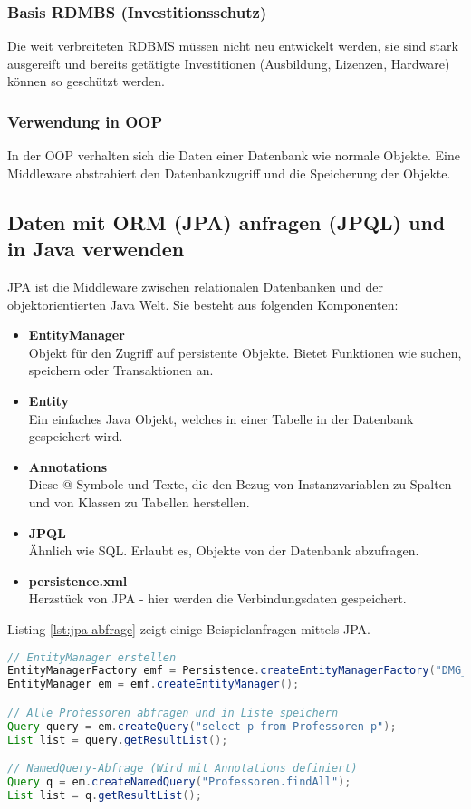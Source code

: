 \subsubsection{Basis RDMBS (Investitionsschutz)}
Die weit verbreiteten RDBMS müssen nicht neu entwickelt werden, sie sind stark ausgereift und bereits getätigte Investitionen (Ausbildung, Lizenzen, Hardware) können so geschützt werden.

\subsubsection{Verwendung in OOP}
In der OOP verhalten sich die Daten einer Datenbank wie normale Objekte. Eine Middleware abstrahiert den Datenbankzugriff und die Speicherung der Objekte.

\subsection{Daten mit ORM (JPA) anfragen (JPQL) und in Java verwenden}

JPA ist die Middleware zwischen relationalen Datenbanken und der objektorientierten Java Welt. Sie besteht aus folgenden Komponenten:

\begin{itemize}
  \item \textbf{EntityManager} \\
  Objekt für den Zugriff auf persistente Objekte. Bietet Funktionen wie suchen, speichern oder Transaktionen an.
  \item \textbf{Entity} \\
  Ein einfaches Java Objekt, welches in einer Tabelle in der Datenbank gespeichert wird.
  \item \textbf{Annotations} \\
  Diese @-Symbole und Texte, die den Bezug von Instanzvariablen zu Spalten und von Klassen zu Tabellen herstellen.
  \item \textbf{JPQL}  \\
  Ähnlich wie SQL. Erlaubt es, Objekte von der Datenbank abzufragen.
  \item \textbf{persistence.xml} \\
  Herzstück von JPA - hier werden die Verbindungsdaten gespeichert.
\end{itemize}

\newpage

Listing \ref{lst:jpa-abfrage} zeigt einige Beispielanfragen mittels JPA.

\begin{lstlisting}[language=Java,keywordstyle=\color{keywordcolor},caption={JPA Grundlagen in Java},label=lst:jpa-abfrage]
// EntityManager erstellen
EntityManagerFactory emf = Persistence.createEntityManagerFactory("DMG_OOPU");
EntityManager em = emf.createEntityManager();

// Alle Professoren abfragen und in Liste speichern
Query query = em.createQuery("select p from Professoren p");
List list = query.getResultList();

// NamedQuery-Abfrage (Wird mit Annotations definiert)
Query q = em.createNamedQuery("Professoren.findAll");
List list = q.getResultList();
\end{lstlisting}

